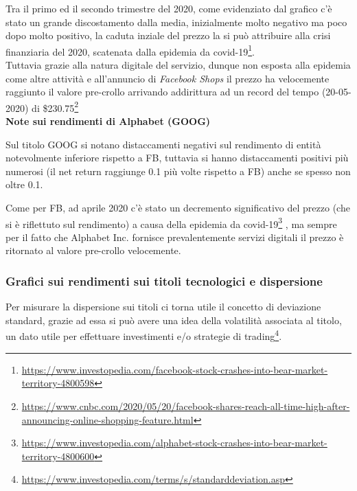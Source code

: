 \documentclass{article}
\begin{document}
Tra il primo ed il secondo trimestre del 2020, come evidenziato dal grafico c'è stato un grande discostamento dalla media, inizialmente molto negativo ma poco dopo molto positivo,
la caduta inziale del prezzo la si può attribuire alla crisi finanziaria del 2020, scatenata dalla epidemia da 
covid-19\footnote{
  \href{https://www.investopedia.com/facebook-stock-crashes-into-bear-market-territory-4800598}{https://www.investopedia.com/facebook-stock-crashes-into-bear-market-territory-4800598}
}.\\
Tuttavia grazie alla natura digitale del servizio, dunque non esposta alla epidemia come altre attività e all'annuncio di \emph{Facebook Shops} il prezzo ha velocemente raggiunto il valore pre-crollo arrivando
addirittura ad un record del tempo (20-05-2020) di 
\$230.75\footnote{
  \href{https://www.cnbc.com/2020/05/20/facebook-shares-reach-all-time-high-after-announcing-online-shopping-feature.html}{https://www.cnbc.com/2020/05/20/facebook-shares-reach-all-time-high-after-announcing-online-shopping-feature.html}
}\\

\textbf{Note sui rendimenti di Alphabet (GOOG)}

Sul titolo GOOG si notano distaccamenti negativi sul rendimento di entità notevolmente inferiore rispetto a FB, tuttavia si hanno distaccamenti positivi più numerosi (il net return raggiunge 0.1 più volte rispetto a FB) anche se spesso non oltre 0.1.

Come per FB, ad aprile 2020 c'è stato un decremento significativo del prezzo (che si è riflettuto sul rendimento) a causa della epidemia da 
covid-19\footnote{
  \href{https://www.investopedia.com/alphabet-stock-crashes-into-bear-market-territory-4800600}{https://www.investopedia.com/alphabet-stock-crashes-into-bear-market-territory-4800600}
}
, ma sempre per il fatto che Alphabet Inc. fornisce
prevalentemente servizi digitali il prezzo è ritornato al valore pre-crollo velocemente.

\subsubsection{Grafici sui rendimenti sui titoli tecnologici e dispersione}

Per misurare la dispersione sui titoli ci torna utile il concetto di deviazione standard, grazie ad essa si può avere una idea della
 volatilità associata al titolo, un dato utile per effettuare investimenti e/o strategie di 
trading\footnote{
  \href{https://www.investopedia.com/terms/s/standarddeviation.asp}{https://www.investopedia.com/terms/s/standarddeviation.asp}
}.\\
\end{document}
